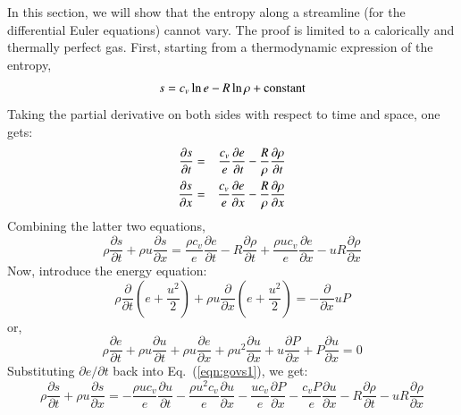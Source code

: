 \documentclass{warpdoc}
\numberwithin{equation}{section}
\newcommand{\alb}{\vspace{0.2cm}\\} %
\newcommand{\Cv}{{c_{v}}}
\begin{document}
In this section, we will show that the entropy along a streamline
(for the differential Euler equations) cannot vary. The proof is limited
to a calorically and thermally perfect gas. First, starting from
a thermodynamic expression of the entropy,
%
\begin{equation}
  s = \Cv \ln e - R \ln \rho + {\rm constant}
\end{equation}
%
Taking the partial derivative on both sides with respect to time
and space, one gets:
%
\begin{eqnarray}
  \frac{\partial s}{\partial t} &=& \frac{\Cv}{e} \frac{\partial e}{\partial t}
      -\frac{R}{\rho} \frac{\partial \rho}{\partial t} \alb
  \frac{\partial s}{\partial x} &=& \frac{\Cv}{e} \frac{\partial e}{\partial x}
      -\frac{R}{\rho} \frac{\partial \rho}{\partial x}
\end{eqnarray}
%
Combining the latter two equations,
%
\begin{equation}
  \rho \frac{\partial s}{\partial t} + \rho u \frac{\partial s}{\partial x}
   = \frac{\rho \Cv}{e} \frac{\partial e}{\partial t} - R \frac{\partial \rho}{\partial t}
     + \frac{\rho u \Cv}{e} \frac{\partial e}{\partial x} - u R \frac{\partial \rho}{\partial x}
  \label{eqn:govs1}
\end{equation}
%
Now, introduce the energy equation:
%
\begin{equation}
  \rho \frac{\partial}{\partial t} \left( e + \frac{u^2}{2} \right)
  + \rho u \frac{\partial}{\partial x} \left( e + \frac{u^2}{2} \right)
  = - \frac{\partial}{\partial x} u P
\end{equation}
%
or,
%
\begin{equation}
  \rho \frac{\partial e}{\partial t} + \rho u \frac{\partial u}{\partial t}
  + \rho u \frac{\partial e}{\partial x} + \rho u^2 \frac{\partial u}{\partial x}
  + u \frac{\partial P}{\partial x} + P \frac{\partial u}{\partial x}
  =0
\end{equation}
%
Substituting $\partial e / \partial t$ back into Eq.~(\ref{eqn:govs1}), we get:
%
\begin{equation}
  \rho \frac{\partial s}{\partial t} + \rho u \frac{\partial s}{\partial x}
  = - \frac{\rho u \Cv}{e} \frac{\partial u}{\partial t}
    - \frac{\rho u^2 \Cv}{e} \frac{\partial u}{\partial x}
    - \frac{u \Cv}{e} \frac{\partial P}{\partial x}
    - \frac{\Cv P}{e} \frac{\partial u}{\partial x}
    - R \frac{\partial \rho}{\partial t}
    - u R \frac{\partial \rho}{\partial x}
  \label{eqn:govs2}
\end{equation}
%
\end{document}
